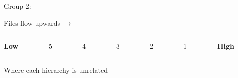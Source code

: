 \documentclass{beamer}
\begin{document}
\begin{frame}
    \vspace*{1cm}
    Group 2:
    \vspace*{-0.3cm}
    \begin{center}
  		Files flow upwards $\boldsymbol{\longrightarrow}$
  	\end{center}
    \vspace*{-1cm}
    \begin{columns}
    \begin{column}[T]{1cm}
     \begin{center}
      \textbf{Low} 
     \end{center} 
     \end{column}
     
     \begin{column}[T]{1cm}
     \begin{center}
      5
     \end{center} 
     \end{column}

     \begin{column}[T]{1cm}
     \begin{center}
     4
     \end{center} 
     \end{column}
     
     \begin{column}[T]{1cm}
     \begin{center}
      3
     \end{center} 
     \end{column}
     
     \begin{column}[T]{1cm}
     \begin{center}
      2
     \end{center} 
     \end{column}
     
     \begin{column}[T]{1cm}
     \begin{center}
      1
     \end{center} 
     \end{column}
     
     \begin{column}[T]{1cm}
     \begin{center}
      \textbf{High}
     \end{center} 
     \end{column}
    \end{columns}
    
    \vspace*{1cm}
    Where each hierarchy is unrelated
  \end{frame}
  
\end{document}
